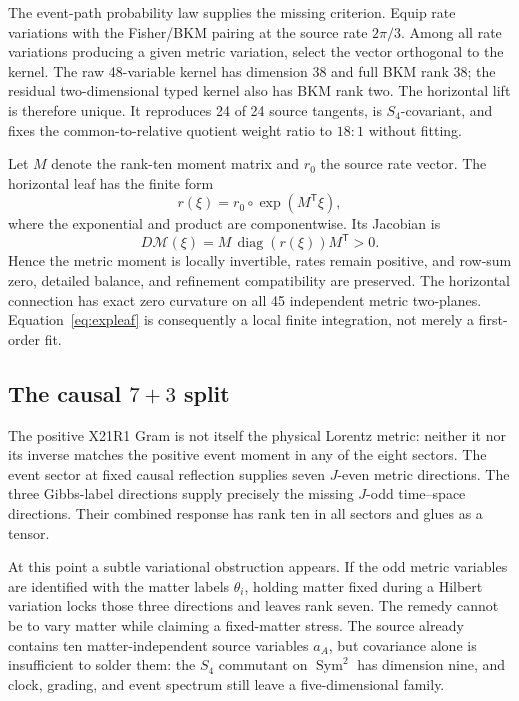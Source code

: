 \documentclass[11pt]{article}
\theoremstyle{definition}
\theoremstyle{remark}
\newcommand{\Sym}{\operatorname{Sym}}
\begin{document}
The event-path probability law supplies the missing criterion. Equip rate variations with the Fisher/BKM pairing at the source rate $2\pi/3$. Among all rate variations producing a given metric variation, select the vector orthogonal to the kernel. The raw 48-variable kernel has dimension 38 and full BKM rank 38; the residual two-dimensional typed kernel also has BKM rank two. The horizontal lift is therefore unique. It reproduces 24 of 24 source tangents, is $S_4$-covariant, and fixes the common-to-relative quotient weight ratio to $18:1$ without fitting.

Let $M$ denote the rank-ten moment matrix and $r_0$ the source rate vector. The horizontal leaf has the finite form
\begin{equation}\label{eq:expleaf}
 r(\xi)=r_0\circ\exp(M^{\mathsf T}\xi),
\end{equation}
where the exponential and product are componentwise. Its Jacobian is
\begin{equation}
 D\mathcal M(\xi)=M\,\operatorname{diag}(r(\xi))M^{\mathsf T}>0.
\end{equation}
Hence the metric moment is locally invertible, rates remain positive, and row-sum zero, detailed balance, and refinement compatibility are preserved. The horizontal connection has exact zero curvature on all 45 independent metric two-planes. Equation~\eqref{eq:expleaf} is consequently a local finite integration, not merely a first-order fit.

\subsection{The causal $7+3$ split}

The positive X21R1 Gram is not itself the physical Lorentz metric: neither it nor its inverse matches the positive event moment in any of the eight sectors. The event sector at fixed causal reflection supplies seven $J$-even metric directions. The three Gibbs-label directions supply precisely the missing $J$-odd time--space directions. Their combined response has rank ten in all sectors and glues as a tensor.

At this point a subtle variational obstruction appears. If the odd metric variables are identified with the matter labels $\theta_i$, holding matter fixed during a Hilbert variation locks those three directions and leaves rank seven. The remedy cannot be to vary matter while claiming a fixed-matter stress. The source already contains ten matter-independent source variables $a_A$, but covariance alone is insufficient to solder them: the $S_4$ commutant on $\Sym^2$ has dimension nine, and clock, grading, and event spectrum still leave a five-dimensional family.
\end{document}
